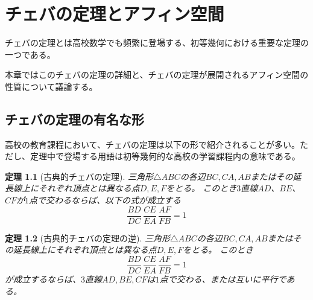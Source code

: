 \documentclass[a4paper,12pt]{bxjsbook}
\newlength{\customindent}
\newenvironment{body}{
  \par
  \begingroup
  \setlength{\leftskip}{\customindent}
  \setlength{\rightskip}{0pt}
  \setlength{\parindent}{1em}
  \setlength{\displayindent}{\customindent}
  \setlength{\displaywidth}{\dimexpr\linewidth-\customindent\relax}
}{
  \par
  \endgroup
}
\theoremstyle{theorem}
\newtheorem{theorem}{定理}[chapter]
\begin{document}
    \chapter{チェバの定理とアフィン空間}
    \begin{body}
        \indent チェバの定理とは高校数学でも頻繁に登場する、初等幾何における重要な定理の一つである。

        \indent 本章ではこのチェバの定理の詳細と、チェバの定理が展開されるアフィン空間の性質について議論する。

    \end{body}

    \section{チェバの定理の有名な形}

    \begin{body}
        \indent 高校の教育課程において、チェバの定理は以下の形で紹介されることが多い。ただし、定理中で登場する用語は初等幾何的な高校の学習課程内の意味である。
    \end{body}

    \begin{theorem}[古典的チェバの定理]\label{thm:classical-ceva}
        三角形$\triangle ABC$の各辺$BC,CA,AB$またはその延長線上にそれぞれ頂点とは異なる点$D,E,F$をとる。
        このとき$3$直線$AD$、$BE$、$CF$が$1$点で交わるならば、以下の式が成立する
        \[
          \dfrac{BD}{DC}\,\dfrac{CE}{EA}\,\dfrac{AF}{FB} = 1
        \]
    \end{theorem}

    \begin{theorem}[古典的チェバの定理の逆]
        三角形$\triangle ABC$の各辺$BC,CA,AB$またはその延長線上にそれぞれ頂点とは異なる点$D,E,F$をとる。
        このとき
        \[
          \dfrac{BD}{DC}\,\dfrac{CE}{EA}\,\dfrac{AF}{FB} = 1
        \]
        が成立するならば、$3$直線$AD,BE,CF$は$1$点で交わる、または互いに平行である。
    \end{theorem}
\end{document}
